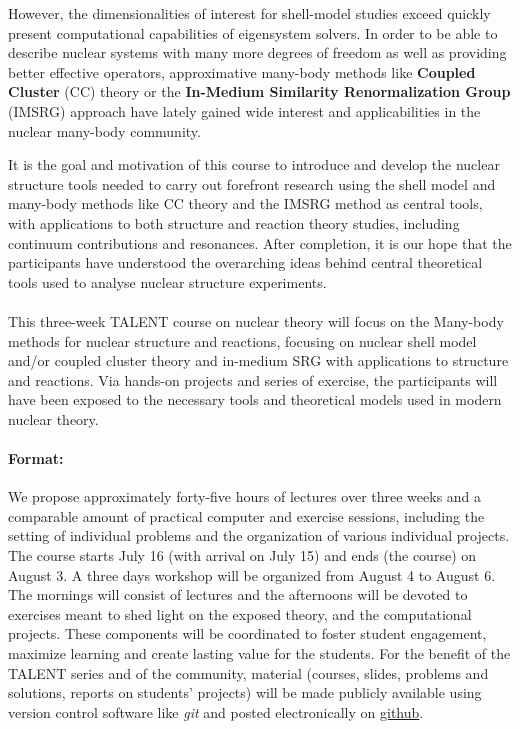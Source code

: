 \documentclass[%
oneside,                 %
final,                   %
10pt]{article}
\begin{document}
However, the dimensionalities of interest for shell-model studies
exceed quickly present computational capabilities of eigensystem
solvers. In order to be able to describe nuclear systems with many
more degrees of freedom as well as providing better effective
operators, approximative many-body methods like \textbf{Coupled Cluster} (CC) theory
or the \textbf{In-Medium Similarity Renormalization Group} (IMSRG) approach have lately
gained wide interest and applicabilities in the nuclear many-body
community.

It is the goal and motivation of this
course to introduce and develop the nuclear structure tools needed to
carry out forefront research using the shell model and many-body
methods like CC theory and the IMSRG method as central tools, with applications to both structure and reaction theory studies, including continuum contributions and resonances.  After completion, it is our
hope that the participants have understood the overarching ideas
behind central theoretical tools used to analyse nuclear structure
experiments.





\paragraph{}

This three-week TALENT course on nuclear theory will focus on the Many-body methods
for nuclear structure and reactions, focusing on nuclear shell model
and/or coupled cluster theory and in-medium SRG with applications to
structure and reactions.  Via hands-on projects and series of exercise, the participants 
will have been exposed to the necessary tools and theoretical models used in modern nuclear theory.


\paragraph{Format:}
We propose approximately forty-five hours of lectures over three weeks and a
comparable amount of practical computer and exercise sessions, including the
setting of individual problems and the organization of various individual projects. The course starts July 16 (with arrival on July 15) and ends (the course) on August 3. A three days workshop will be organized from August 4 to August 6. 
The mornings will consist of lectures and the
afternoons will be devoted to exercises meant to shed light on the exposed theory, 
and the computational projects. These
components will be coordinated to foster student engagement,
maximize learning and create lasting value for the students. For the
benefit of the TALENT series and of the community, material (courses,
slides, problems and solutions, reports on students' projects) will be
made publicly available using version control software like \emph{git} and posted electronically on 
\href{{https://github.com}}{github}. 
\end{document}
